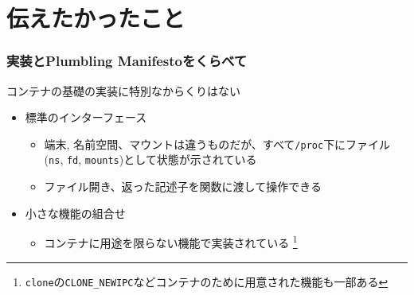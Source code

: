 \documentclass[unicode, 14pt, aspectratio=169]{beamer}
\begin{document}
\section{伝えたかったこと}
\begin{frame}[t]
  \frametitle{実装とPlumbling Manifestoをくらべて}
  \large
  コンテナの基礎の実装に特別なからくりはない
  \normalsize
  \begin{itemize}[leftmargin=0.8cm,label=$\circ$]
  \item 標準のインターフェース
    \begin{itemize}[leftmargin=0.8cm,label=$\circ$]
    \item 端末, 名前空間、マウントは違うものだが、すべて\texttt{/proc}下にファイル(\texttt{ns}, \texttt{fd}, \texttt{mounts})として状態が示されている
    \item ファイル開き、返った記述子を関数に渡して操作できる
    \end{itemize}
  \item 小さな機能の組合せ
    \begin{itemize}[leftmargin=0.8cm,label=$\circ$]
      \item コンテナに用途を限らない機能で実装されている
      \footnote{\texttt{clone}の\texttt{CLONE\_NEWIPC}などコンテナのために用意された機能も一部ある\supercite{clone}}
    \end{itemize}
  \end{itemize}  
\end{frame}
\end{document}
